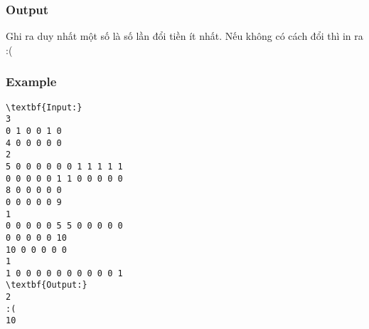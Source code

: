 \subsubsection{Output}

Ghi ra duy nhất một số là số lần đổi tiền ít nhất. Nếu không có cách đổi thì in ra :(

\subsubsection{Example}
\begin{verbatim}
\textbf{Input:}
3
0 1 0 0 1 0 
4 0 0 0 0 0
2
5 0 0 0 0 0 0 1 1 1 1 1
0 0 0 0 0 1 1 0 0 0 0 0
8 0 0 0 0 0
0 0 0 0 0 9
1
0 0 0 0 0 5 5 0 0 0 0 0
0 0 0 0 0 10
10 0 0 0 0 0
1
1 0 0 0 0 0 0 0 0 0 0 1
\textbf{Output:}
2
:(
10\end{verbatim}